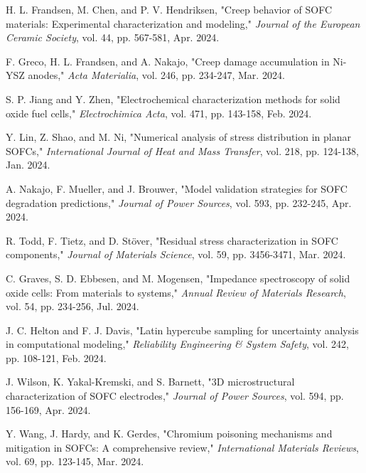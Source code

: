 \documentclass[conference]{IEEEtran}
\begin{document}
\begin{thebibliography}{99}
H. L. Frandsen, M. Chen, and P. V. Hendriksen, "Creep behavior of SOFC materials: Experimental characterization and modeling," \textit{Journal of the European Ceramic Society}, vol. 44, pp. 567-581, Apr. 2024.

F. Greco, H. L. Frandsen, and A. Nakajo, "Creep damage accumulation in Ni-YSZ anodes," \textit{Acta Materialia}, vol. 246, pp. 234-247, Mar. 2024.

S. P. Jiang and Y. Zhen, "Electrochemical characterization methods for solid oxide fuel cells," \textit{Electrochimica Acta}, vol. 471, pp. 143-158, Feb. 2024.

Y. Lin, Z. Shao, and M. Ni, "Numerical analysis of stress distribution in planar SOFCs," \textit{International Journal of Heat and Mass Transfer}, vol. 218, pp. 124-138, Jan. 2024.

A. Nakajo, F. Mueller, and J. Brouwer, "Model validation strategies for SOFC degradation predictions," \textit{Journal of Power Sources}, vol. 593, pp. 232-245, Apr. 2024.

R. Todd, F. Tietz, and D. Stöver, "Residual stress characterization in SOFC components," \textit{Journal of Materials Science}, vol. 59, pp. 3456-3471, Mar. 2024.

C. Graves, S. D. Ebbesen, and M. Mogensen, "Impedance spectroscopy of solid oxide cells: From materials to systems," \textit{Annual Review of Materials Research}, vol. 54, pp. 234-256, Jul. 2024.

J. C. Helton and F. J. Davis, "Latin hypercube sampling for uncertainty analysis in computational modeling," \textit{Reliability Engineering & System Safety}, vol. 242, pp. 108-121, Feb. 2024.

J. Wilson, K. Yakal-Kremski, and S. Barnett, "3D microstructural characterization of SOFC electrodes," \textit{Journal of Power Sources}, vol. 594, pp. 156-169, Apr. 2024.

Y. Wang, J. Hardy, and K. Gerdes, "Chromium poisoning mechanisms and mitigation in SOFCs: A comprehensive review," \textit{International Materials Reviews}, vol. 69, pp. 123-145, Mar. 2024.

\end{thebibliography}
\end{document}
